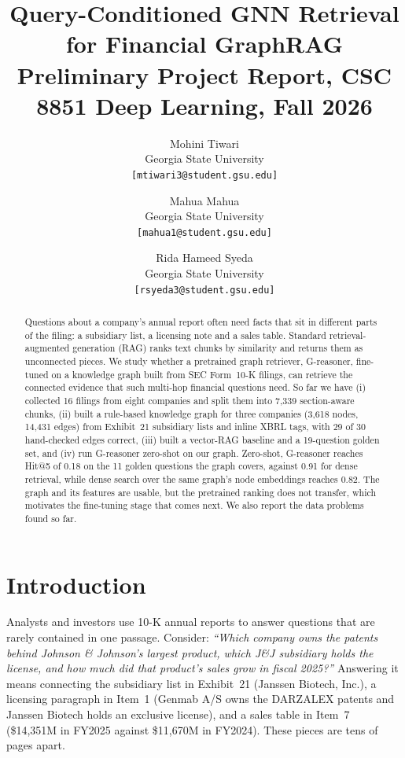 \documentclass[10pt,twocolumn,letterpaper]{article}
\title{Query-Conditioned GNN Retrieval for Financial GraphRAG\\
{\large Preliminary Project Report, CSC 8851 Deep Learning, Fall 2026}}
\author{
Mohini Tiwari\\
Georgia State University\\
{\tt\small [mtiwari3@student.gsu.edu]}
\and
Mahua Mahua\\
Georgia State University\\
{\tt\small [mahua1@student.gsu.edu]}
\and
Rida Hameed Syeda\\
Georgia State University\\
{\tt\small [rsyeda3@student.gsu.edu]}
}
\begin{document}
\maketitle

\begin{abstract}
Questions about a company's annual report often need facts that sit in different parts of the
filing: a subsidiary list, a licensing note and a sales table. Standard retrieval-augmented
generation (RAG) ranks text chunks by similarity and returns them as unconnected pieces. We study
whether a pretrained graph retriever, G-reasoner, fine-tuned on a knowledge graph built from SEC
Form~10-K filings, can retrieve the connected evidence that such multi-hop financial questions need.
So far we have (i) collected 16 filings from eight companies and split them into 7,339 section-aware
chunks, (ii) built a rule-based knowledge graph for three companies (3,618 nodes, 14,431 edges) from
Exhibit~21 subsidiary lists and inline XBRL tags, with 29 of 30 hand-checked edges correct,
(iii) built a vector-RAG baseline and a 19-question golden set, and (iv) run G-reasoner zero-shot on
our graph. Zero-shot, G-reasoner reaches Hit@5 of 0.18 on the 11 golden questions the graph covers,
against 0.91 for dense retrieval, while dense search over the same graph's node embeddings reaches
0.82. The graph and its features are usable, but the pretrained ranking does not transfer, which
motivates the fine-tuning stage that comes next. We also report the data problems found so far.
\end{abstract}

\section{Introduction}
\label{sec:intro}

Analysts and investors use 10-K annual reports to answer questions that are rarely contained in one
passage. Consider: \emph{``Which company owns the patents behind Johnson \& Johnson's largest product,
which J\&J subsidiary holds the license, and how much did that product's sales grow in fiscal 2025?''}
Answering it means connecting the subsidiary list in Exhibit~21 (Janssen Biotech, Inc.), a licensing
paragraph in Item~1 (Genmab A/S owns the DARZALEX patents and Janssen Biotech holds an exclusive
license), and a sales table in Item~7 (\$14,351M in FY2025 against \$11,670M in FY2024). These pieces
are tens of pages apart.
\end{document}
